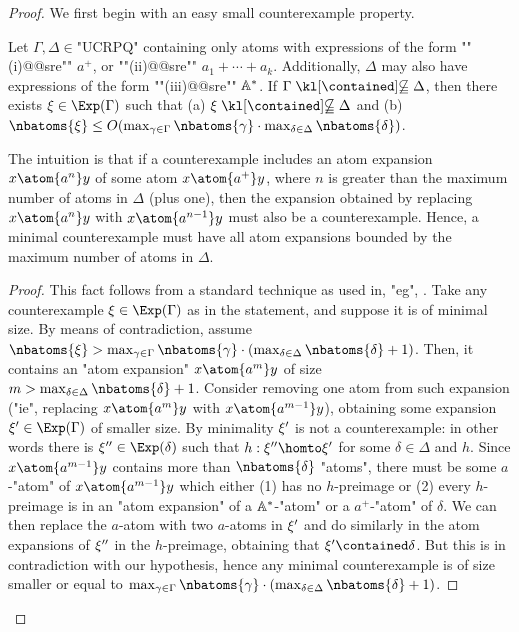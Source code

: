 \begin{proof}
	We first begin with an easy small counterexample property.
	\begin{claim}
		\AP\label{cl:small-counterexample-SRE}
		Let $\Gamma, \Delta \in \text{"UCRPQ"}$ containing only atoms with expressions of the form \AP""(i)@@sre"" $a^+$, or ""(ii)@@sre"" $a_1 + \dotsb + a_k$. Additionally, $\Delta$ may also have expressions of the form ""(iii)@@sre"" $\mathbb{A}^*$. If $\Gamma \notcontained \Delta$, then there exists $\anexpansion \in \Exp(\Gamma)$ such that (a) $\anexpansion \notcontained \Delta$ and (b) $\nbatoms{\anexpansion} \leq O(\max_{\gamma \in \Gamma}\nbatoms{\gamma} \cdot \max_{\delta \in \Delta}\nbatoms{\delta})$.
	\end{claim}

	The intuition is that if a counterexample includes an atom expansion $x \atom{a^n} y$ of some atom $x \atom{a^+} y$, where $n$ is greater than the maximum number of atoms in $\Delta$ (plus one), then the expansion obtained by replacing $x \atom{a^n} y$ with $x \atom{a^{n-1}} y$ must also be a counterexample. Hence, a minimal counterexample must have all atom expansions bounded by the maximum number of atoms in $\Delta$.

	\begin{proof}
		This fact follows from a standard technique as used in, "eg", \cite{FigueiraEtal2020Containment}.
		Take any counterexample $\anexpansion \in \Exp(\Gamma)$ as in the statement, and suppose it is of minimal size. By means of contradiction, assume $\nbatoms{\anexpansion} > \max_{\gamma \in \Gamma}\nbatoms{\gamma} \cdot (\max_{\delta \in \Delta}\nbatoms{\delta}+1)$. 
		Then, it contains an "atom expansion" $x \atom{a^m} y$ of size $m>\max_{\delta \in \Delta}\nbatoms{\delta}+1$. 
		Consider removing one atom from such expansion ("ie", replacing $x \atom{a^m} y$ with $x \atom{a^{m-1}} y$), obtaining some expansion $\anexpansion' \in \Exp(\Gamma)$ of smaller size. By minimality $\xi'$ is not a counterexample: in other words there is  $\anexpansion'' \in \Exp(\delta)$ such that $h:\anexpansion'' \homto \anexpansion'$ for some $\delta \in \Delta$ and $h$. Since $x \atom{a^{m-1}} y$ contains more than $\nbatoms{\delta}$ "atoms", there must be some $a$-"atom" of $x \atom{a^{m-1}} y$ which either (1) has no $h$-preimage or (2) every $h$-preimage is in an "atom expansion" of a $\mathbb{A}^*$-"atom" or a $a^+$-"atom" of $\delta$. We can then replace the $a$-atom with two $a$-atoms in $\xi'$ and do similarly in the atom expansions of $\xi''$ in the $h$-preimage, obtaining that $\anexpansion' \contained \delta$. But this is in contradiction with our hypothesis, hence any minimal counterexample is of size smaller or equal to $\max_{\gamma \in \Gamma}\nbatoms{\gamma} \cdot (\max_{\delta \in \Delta}\nbatoms{\delta}+1)$.
	\end{proof}
	

\end{proof}
